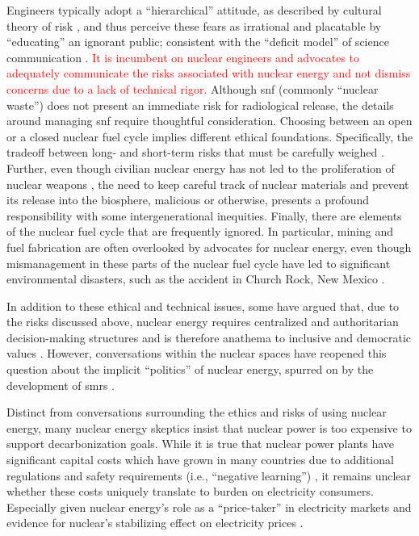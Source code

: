 \noindent
Engineers typically adopt a ``hierarchical'' attitude, as described by cultural
theory of risk \cite{van_de_graaff_understanding_2016,mcneeley_cultural_2014},
and thus perceive these fears as irrational and placatable by ``educating'' an
ignorant public; consistent with the ``deficit model'' of science communication
\cite{simis_lure_2016,patenaude_topical_2022}. \textcolor{red}{It is incumbent
on nuclear engineers and advocates to adequately communicate the risks
associated with nuclear energy and not dismiss concerns due to a lack of
technical rigor.} Although \ac{snf} (commonly ``nuclear waste'') does not
present an immediate risk for radiological release, the details around managing \ac{snf} require
thoughtful consideration. Choosing between an open or a closed nuclear fuel
cycle implies different ethical foundations. Specifically, the tradeoff between
long- and short-term risks that must be carefully weighed
\cite{taebi_recycle_2008}. Further, even though civilian nuclear energy has not
led to the proliferation of nuclear weapons
\cite{herzog_nuclear_2020,miller_why_2017}, the need to keep careful track of
nuclear materials and prevent its release into the biosphere, malicious or
otherwise, presents a profound responsibility with some intergenerational
inequities. Finally, there are elements of the nuclear fuel cycle that 
are frequently ignored. In particular, mining and fuel fabrication are 
often overlooked by advocates for nuclear energy, even though mismanagement in these parts of
the nuclear fuel cycle have led to significant environmental disasters, such as the 
accident in Church Rock, New Mexico \cite{moore-nall_legacy_2015,rojavin_civilian_2011}. 

In addition to these ethical and technical issues, some have argued that, due to the
risks discussed above, nuclear energy requires centralized and authoritarian decision-making
structures and is therefore anathema to inclusive and democratic
values \cite{van_de_graaff_understanding_2016, winner_artifacts_1980}. However, conversations
within the nuclear spaces have reopened this question about the implicit ``politics'' of nuclear
energy, spurred on by the development of \acp{smr} \cite{lovering_social_2021}.

Distinct from conversations surrounding the ethics and risks of using nuclear
energy, many nuclear energy skeptics insist that nuclear power is too expensive
to support decarbonization goals. While it is true that nuclear power plants
have significant capital costs \cite{nrel_2020_2020} which have grown in many
countries due to additional regulations and safety requirements (i.e.,
``negative learning'') \cite{lovering_historical_2016}, it remains unclear
whether these costs uniquely translate to burden on electricity consumers.
Especially given nuclear energy's role as a ``price-taker'' in electricity
markets \cite{murphy_impacts_2019} and evidence for nuclear's stabilizing effect
on electricity prices \cite{dotson_influence_2022,de_sisternes_value_2016}.

